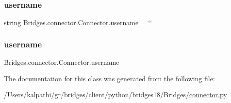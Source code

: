 \subsubsection{\texorpdfstring{username}{username}\hspace{0.1cm}{\footnotesize\ttfamily [1/2]}}
{\footnotesize\ttfamily string Bridges.\+connector.\+Connector.\+username = \char`\"{}\char`\"{}\hspace{0.3cm}{\ttfamily [static]}}

\mbox{\label{class_bridges_1_1connector_1_1_connector_ab87dbc1ca549f3c2b4ac5a19abcc20e0}} 
\subsubsection{\texorpdfstring{username}{username}\hspace{0.1cm}{\footnotesize\ttfamily [2/2]}}
{\footnotesize\ttfamily Bridges.\+connector.\+Connector.\+username}



The documentation for this class was generated from the following file\+:\begin{DoxyCompactItemize}
\item 
/\+Users/kalpathi/gr/bridges/client/python/bridges18/\+Bridges/\mbox{\hyperlink{connector_8py}{connector.\+py}}\end{DoxyCompactItemize}
